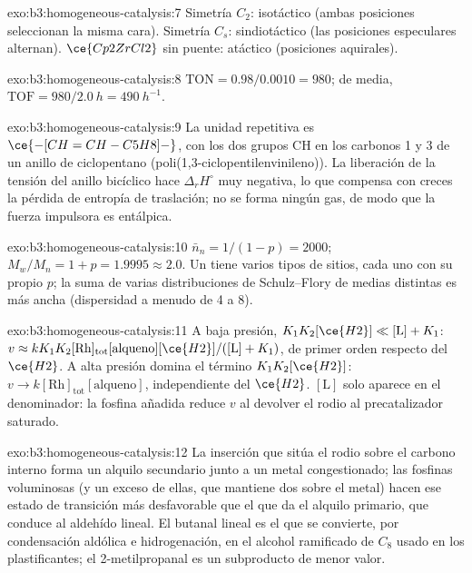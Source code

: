 \begin{solution}{exo:b3:homogeneous-catalysis:7}
Simetría $C_2$: isotáctico (ambas posiciones seleccionan la misma cara). Simetría $C_s$:
sindiotáctico (las posiciones especulares alternan). $\ce{Cp2ZrCl2}$ sin puente: atáctico (posiciones
aquirales).
\end{solution}

\begin{solution}{exo:b3:homogeneous-catalysis:8}
$\mathrm{TON} = 0.98/0.0010 = 980$; de media, $\mathrm{TOF} = 980/\qty{2.0}{h} = \qty{490}{h^{-1}}$.
\end{solution}

\begin{solution}{exo:b3:homogeneous-catalysis:9}
La unidad repetitiva es $\ce{-[CH=CH-C5H8]-}$, con los dos grupos CH en los carbonos 1 y 3 de un
anillo de ciclopentano (poli(1,3-ciclopentilenvinileno)). La liberación de la
tensión del anillo bicíclico hace $\Delta_rH^\circ$ muy negativa, lo que compensa con creces la
pérdida de entropía de traslación; no se forma ningún gas, de modo que la fuerza impulsora es
entálpica.
\end{solution}

\begin{solution}{exo:b3:homogeneous-catalysis:10}
$\bar n_n = 1/(1 - p) = 2000$; $M_w/M_n = 1 + p = 1.9995 \approx 2.0$. Un  tiene
varios tipos de sitios, cada uno con su propio $p$; la suma de varias distribuciones de
Schulz--Flory de medias distintas es más ancha (dispersidad a menudo de 4 a 8).
\end{solution}

\begin{solution}{exo:b3:homogeneous-catalysis:11}
A baja presión, $K_1K_2[\ce{H2}] \ll [\mathrm L] + K_1$: $v \approx kK_1K_2[\mathrm{Rh}]_{\mathrm{tot}}[\text{alqueno}][\ce{H2}]/([\mathrm L] + K_1)$,
de primer orden respecto del $\ce{H2}$. A alta presión domina el término $K_1K_2[\ce{H2}]$: $v \to k[\mathrm{Rh}]_{\mathrm{tot}}[\text{alqueno}]$,
independiente del $\ce{H2}$. $[\mathrm L]$ solo aparece en el denominador: la fosfina añadida reduce $v$
al devolver el rodio al precatalizador saturado.
\end{solution}

\begin{solution}{exo:b3:homogeneous-catalysis:12}
La inserción que sitúa el rodio sobre el carbono interno forma un alquilo secundario
junto a un metal congestionado; las fosfinas voluminosas (y un exceso de ellas, que mantiene dos
sobre el metal) hacen ese estado de transición más desfavorable que el que da el alquilo
primario, que conduce al aldehído lineal. El butanal lineal es el que se convierte,
por condensación aldólica e hidrogenación, en el alcohol ramificado de $C_8$ usado en los
plastificantes; el 2-metilpropanal es un subproducto de menor valor.
\end{solution}


